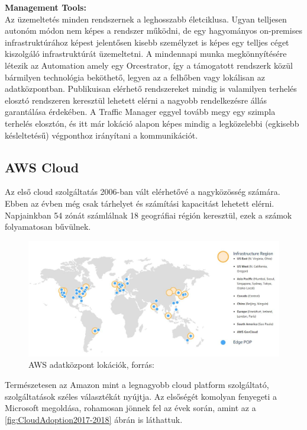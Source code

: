 \documentclass[12pt,oneside,justify,table]{book}
\begin{document}
\noindent \textbf{Management Tools:}\\
Az üzemeltetés minden rendszernek a leghosszabb életciklusa. Ugyan telljesen autonóm módon nem képes a rendszer működni, de egy hagyományos on-premises infrastruktúrához képest jelentősen kisebb személyzet is képes egy telljes céget kiszolgáló infrastruktúrát üzemeltetni. A mindennapi munka megkönnyítésére létezik az Automation amely egy Orcestrator, így a támogatott rendszerk közül bármilyen technológia beköthető, legyen az a felhőben vagy lokálisan az adatközpontban. Publikuisan elérhető rendszereket mindig is valamilyen terhelés elosztó rendszeren keresztül lehetett elérni a nagyobb rendelkezésre állás garantálása érdekében. A Traffic Manager eggyel tovább megy egy szimpla terhelés elosztón, és itt már lokáció alapon képes mindig a legközelebbi (egkisebb késleltetésű) végponthoz irányítani a kommunikációt.  \\
\newpage
\subsection{AWS Cloud}
Az első cloud szolgáltatás 2006-ban vált elérhetővé a nagyközösség számára. Ebben az évben még csak tárhelyet és számítási kapacitást lehetett elérni. Napjainkban 54 zónát számlálnak 18 geográfiai régión keresztül, ezek a számok folyamatosan bűvülnek.
\begin{figure}[h]
\centering
\includegraphics[width=1\textwidth]{aws_locations.jpg}
\caption{AWS adatközpont lokációk, forrás: \cite{AWS_Regions}}
\label{fig:AWSRegions}
\end{figure}

Természetesen az Amazon mint a legnagyobb cloud platform szolgáltató, szolgáltatások széles választékát nyújtja. Az elsőségét komolyan fenyegeti a Microsoft megoldása, rohamosan jönnek fel az évek során, amint az a \ref{fig:CloudAdoption2017-2018} ábrán is láthattuk.  \\
\end{document}
